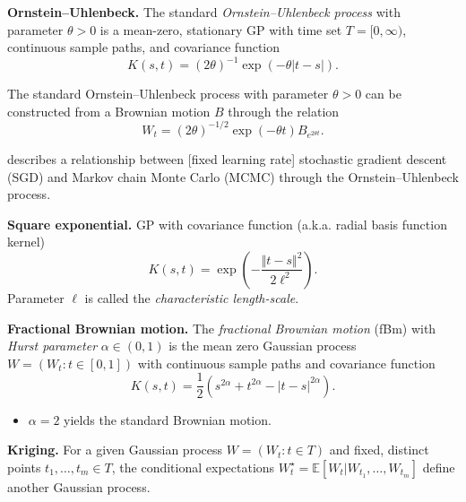 \begin{example}\textbf{Ornstein--Uhlenbeck.}
	The standard \textit{Ornstein--Uhlenbeck process} with parameter $\theta>0$ is a mean-zero, stationary GP with time set $T = [0, \infty)$, continuous sample paths, and covariance function
		$$K(s,t) = (2\theta)^{-1}\exp\left(-\theta|t-s|\right).$$
\end{example}

	The standard Ornstein--Uhlenbeck process with parameter $\theta>0$ can be constructed from a Brownian motion $B$ through the relation 	
	$$W_t = (2\theta)^{-1/2}\exp\left(-\theta t\right)B_{e^{2\theta t}}.$$

\citet{mandt2017stochastic} describes a relationship between [fixed learning rate] \alert{stochastic gradient descent} (SGD) and \alert{Markov chain Monte Carlo} (MCMC) through the Ornstein--Uhlenbeck process.







	
\begin{example}\textbf{Square exponential.}
	GP with covariance function (a.k.a. radial basis function kernel)
	$$K(s,t) = \exp\left(-\frac{\Vert t-s\Vert^2}{2\ell^2}\right).$$
	Parameter $\ell$ is called the \textit{characteristic length-scale}.
\end{example}


\begin{example}\textbf{Fractional Brownian motion.}
	The \textit{fractional Brownian motion} (fBm) with \textit{Hurst parameter} $\alpha\in  (0, 1)$ is the mean zero Gaussian process $ W = (W_t : t \in  [0, 1])$ with continuous sample paths and covariance function
	$$K(s,t) = \frac{1}{2}\left(s^{2\alpha}+t^{2\alpha}-|t-s|^{2\alpha}\right).$$
	\begin{itemize}
		\item $\alpha=2$ yields the standard Brownian motion.
	\end{itemize}
\end{example}
	





\begin{example}\textbf{Kriging.}
	For a given Gaussian process $W = (W_t : t \in T)$ and fixed, distinct points $t_1,\ldots,t_m \in T$, the conditional expectations $W_t^\star  = \mathbb{E}[ W_t|W_{t_1},\ldots,W_{t_m}]$ define another Gaussian process.
\end{example}


